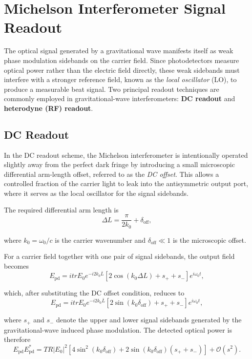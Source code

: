 \documentclass{report}
\begin{document}
\section{Michelson Interferometer Signal Readout}

The optical signal generated by a gravitational wave manifests itself as weak phase modulation sidebands on the carrier field. Since photodetectors measure optical power rather than the electric field directly, these weak sidebands must interfere with a stronger reference field, known as the \textit{local oscillator} (LO), to produce a measurable beat signal. Two principal readout techniques are commonly employed in gravitational-wave interferometers: \textbf{DC readout} and \textbf{heterodyne (RF) readout}.

\subsection{DC Readout}

In the DC readout scheme, the Michelson interferometer is intentionally operated slightly away from the perfect dark fringe by introducing a small microscopic differential arm-length offset, referred to as the \textit{DC offset}. This allows a controlled fraction of the carrier light to leak into the antisymmetric output port, where it serves as the local oscillator for the signal sidebands.

The required differential arm length is
\begin{equation}
    \Delta L=\frac{\pi}{2k_0}+\delta_{\mathrm{off}},
\end{equation}

where $k_0=\omega_0/c$ is the carrier wavenumber and $\delta_{\mathrm{off}}\ll1$ is the microscopic offset.

For a carrier field together with one pair of signal sidebands, the output field becomes
\begin{equation}
    E_{\text{pd}}
    =
itrE_0e^{-i2k_0\bar{L}}
\left[
2\cos(k_0\Delta L)
+s_{+}+s_{-}
\right]
e^{i\omega_0t},
\end{equation}


which, after substituting the DC offset condition, reduces to
\begin{equation}
    E_{\text{pd}}
=
itrE_0e^{-i2k_0\bar{L}}
\left[
2\sin(k_0\delta_{\mathrm{off}})
+s_{+}+s_{-}
\right]
e^{i\omega_0t},
\end{equation}

where $s_{+}$ and $s_{-}$ denote the upper and lower signal sidebands generated by the gravitational-wave induced phase modulation. The detected optical power is therefore
\begin{equation}
    E_{\text{pd}}E_{\text{pd}}^{*}
=
TR|E_0|^2
\left[
4\sin^2(k_0\delta_{\mathrm{off}})
+
2\sin(k_0\delta_{\mathrm{off}})
(s_{+}+s_{-})
\right]
+\mathcal{O}(s^2).
\end{equation}
\end{document}
